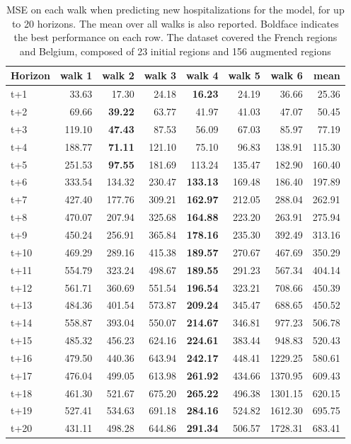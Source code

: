 \begin{table}[H]
\centering
\caption{MSE on each walk when predicting new hospitalizations for the model, for up to 20 horizons. The mean over all walks is also reported. Boldface indicates the best performance on each row. The dataset covered the French regions and Belgium, composed of 23 initial regions and 156 augmented regions }
\label{tab:MSE_walk_dense_model}
\begin{tabular}{lrrrrrrr}
\toprule
Horizon &  walk 1 &  walk 2 &  walk 3 &  walk 4 &  walk 5 &  walk 6 &   mean \\
\midrule
t+1  & 33.63  & 17.30  & 24.18  & \textbf{16.23}  & 24.19  & 36.66  & 25.36  \\
t+2  & 69.66  & \textbf{39.22}  & 63.77  & 41.97  & 41.03  & 47.07  & 50.45  \\
t+3  & 119.10  & \textbf{47.43}  & 87.53  & 56.09  & 67.03  & 85.97  & 77.19  \\
t+4  & 188.77  & \textbf{71.11}  & 121.10  & 75.10  & 96.83  & 138.91  & 115.30  \\
t+5  & 251.53  & \textbf{97.55}  & 181.69  & 113.24  & 135.47  & 182.90  & 160.40  \\
t+6  & 333.54  & 134.32  & 230.47  & \textbf{133.13}  & 169.48  & 186.40  & 197.89  \\
t+7  & 427.40  & 177.76  & 309.21  & \textbf{162.97}  & 212.05  & 288.04  & 262.91  \\
t+8  & 470.07  & 207.94  & 325.68  & \textbf{164.88}  & 223.20  & 263.91  & 275.94  \\
t+9  & 450.24  & 256.91  & 365.84  & \textbf{178.16}  & 235.30  & 392.49  & 313.16  \\
t+10  & 469.29  & 289.16  & 415.38  & \textbf{189.57}  & 270.67  & 467.69  & 350.29  \\
t+11  & 554.79  & 323.24  & 498.67  & \textbf{189.55}  & 291.23  & 567.34  & 404.14  \\
t+12  & 561.71  & 360.69  & 551.54  & \textbf{196.54}  & 323.21  & 708.66  & 450.39  \\
t+13  & 484.36  & 401.54  & 573.87  & \textbf{209.24}  & 345.47  & 688.65  & 450.52  \\
t+14  & 558.87  & 393.04  & 550.07  & \textbf{214.67}  & 346.81  & 977.23  & 506.78  \\
t+15  & 485.32  & 456.23  & 624.16  & \textbf{224.61}  & 383.44  & 948.83  & 520.43  \\
t+16  & 479.50  & 440.36  & 643.94  & \textbf{242.17}  & 448.41  & 1229.25  & 580.61  \\
t+17  & 476.04  & 499.05  & 613.98  & \textbf{261.92}  & 434.66  & 1370.95  & 609.43  \\
t+18  & 461.30  & 521.67  & 675.20  & \textbf{265.22}  & 496.38  & 1301.15  & 620.15  \\
t+19  & 527.41  & 534.63  & 691.18  & \textbf{284.16}  & 524.82  & 1612.30  & 695.75  \\
t+20  & 431.11  & 498.28  & 644.86  & \textbf{291.34}  & 506.57  & 1728.31  & 683.41  \\

\bottomrule
\end{tabular}
\end{table}
